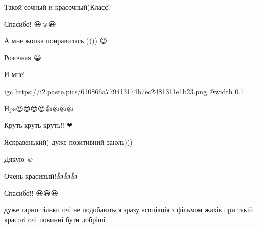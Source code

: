  
 
 
 
 

\qqSecCmt


Такой сочный и красочный)Класс!🙂

\begin{itemize} %
Спасибо! 😃☺️😃
\end{itemize} %


А мне жопка понравилась )))) 😉🌸

\begin{itemize} %

Розочная 😂


И мне! 🐰


\ifcmt
  igc https://i2.paste.pics/610866a779413174b7ec2481311e1b23.png
	@width 0.1
\fi

\end{itemize} %


Нра😍😍😍😍👍👍👍👍


Круть-круть-круть!! ❤


Яскравенький) дуже позитивний заюль)))

\begin{itemize} %
Дякую ☺️
\end{itemize} %


Очень красивый!👍👍👍🌸🌸🌸

\begin{itemize} %
Спасибо!! 😃😃😃
\end{itemize} %


дуже гарно тільки очі не подобаються зразу асоціація з фільмом жахів при такій
красоті очі повинні бути добріші

